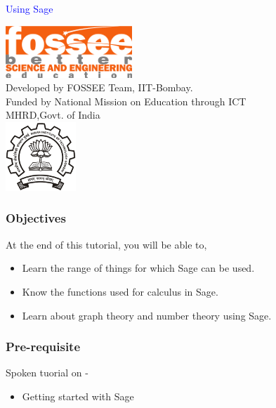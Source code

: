 \documentclass[presentation]{beamer}
\title{}
\author{FOSSEE}
\date{}
\begin{document}
\begin{frame}

\begin{center}
\vspace{12pt}
\textcolor{blue}{\huge Using Sage}
\end{center}
\vspace{18pt}
\begin{center}
\vspace{10pt}
\includegraphics[scale=0.95]{../images/fossee-logo.png}\\
\vspace{5pt}
\scriptsize Developed by FOSSEE Team, IIT-Bombay. \\ 
\scriptsize Funded by National Mission on Education through ICT\\
\scriptsize  MHRD,Govt. of India\\
\includegraphics[scale=0.30]{../images/iitb-logo.png}\\
\end{center}
\end{frame}
\begin{frame}
\frametitle{Objectives}
\label{sec-2}

 At the end of this tutorial, you will be able to,


\begin{itemize}
\item Learn the range of things for which Sage can be used.
\item Know the functions used for calculus in Sage.
\item Learn about graph theory and number theory using Sage.
\end{itemize}
\end{frame}
\begin{frame}
\frametitle{Pre-requisite}
\label{sec-3}

  Spoken tuorial on -

\begin{itemize}
\item Getting started with Sage
\end{itemize}
\end{frame}
\end{document}
